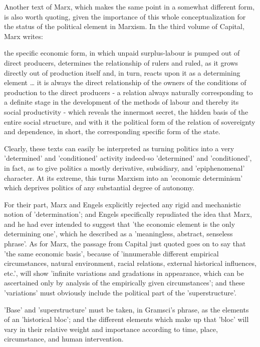 Another text of Marx, which makes the same point in a somewhat different form, is also worth quoting, given the importance of this whole conceptualization for the status of the political element in Marxism. In the third volume of Capital, Marx writes:
\begin{displayquote}
    the specific economic form, in which unpaid surplus-labour is pumped out of direct producers, determines the relationship of rulers and ruled, as it grows directly out of production itself and, in turn, reacts upon it as a determining element \dots{} it is always the direct relationship of the owners of the conditions of production to the direct producers - a relation always naturally corresponding to a definite stage in the development of the methods of labour and thereby its social productivity - which reveals the innermost secret, the hidden basis of the entire social structure, and with it the political form of the relation of sovereignty and dependence, in short, the corresponding specific form of the state.
\end{displayquote}

Clearly, these texts can easily be interpreted as turning politics into a very 'determined' and 'conditioned' activity indeed-so 'determined' and 'conditioned', in fact, as to give politics a mostly derivative, subsidiary, and 'epiphenomenal' character. At its extreme, this turns Marxism into an 'economic determinism' which deprives politics of any substantial degree of autonomy.

For their part, Marx and Engels explicitly rejected any rigid and mechanistic notion of 'determination'; and Engels specifically repudiated the idea that Marx, and he had ever intended to suggest that 'the economic element is the only determining one', which he described as a 'meaningless, abstract, senseless phrase'. As for Marx, the passage from Capital just quoted goes on to say that 'the same economic basis', because of 'innumerable different empirical circumstances, natural environment, racial relations, external historical influences, etc.', will show 'infinite variations and gradations in appearance, which can be ascertained only by analysis of the empirically given circumstances'; and these 'variations' must obviously include the political part of the 'superstructure'.

'Base' and 'superstructure' must be taken, in Gramsci's phrase, as the elements of an 'historical bloc'; and the different elements which make up that 'bloc' will vary in their relative weight and importance according to time, place, circumstance, and human intervention.

